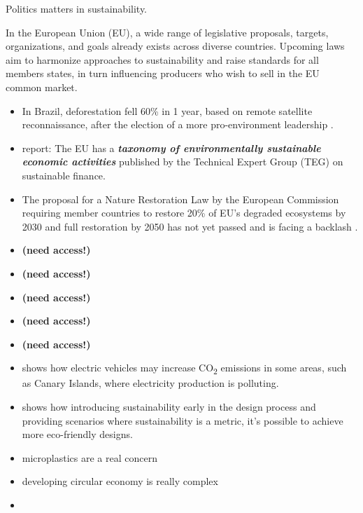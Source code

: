 \documentclass[
  letterpaper,
  DIV=11,
  numbers=noendperiod]{scrartcl}
\begin{document}
Politics matters in sustainability.

In the European Union (EU), a wide range of legislative proposals,
targets, organizations, and goals already exists across diverse
countries. Upcoming laws aim to harmonize approaches to sustainability
and raise standards for all members states, in turn influencing
producers who wish to sell in the EU common market.

\begin{itemize}
\item
  In Brazil, deforestation fell 60\% in 1 year, based on remote
  satellite reconnaissance, after the election of a more pro-environment
  leadership \citet{wattsAmazonDeforestationFalls2023}.
\item
  \citet{EUTaxonomySustainable} report: The EU has a
  \textbf{\emph{taxonomy of environmentally sustainable economic
  activities}} published by the Technical Expert Group (TEG) on
  sustainable finance.
\item
  The proposal for a Nature Restoration Law by the European Commission
  requiring member countries to restore 20\% of EU's degraded ecosystems
  by 2030 and full restoration by 2050 has not yet passed
  \citet{ScientistsUrgeEuropean2023} and is facing a backlash
  \citet{davidpintoBacklashNatureRestoration2023}.
\item
  \citet{MANZARDO2021149507} \textbf{(need access!)}
\item
  \citet{INARRA2022100727} \textbf{(need access!)}
\item
  \citet{MUNARO2022566} \textbf{(need access!)}
\item
  \citet{BASSANI2022151565} \textbf{(need access!)}
\item
  \citet{VANDOORSSELAER2022189} \textbf{(need access!)}
\item
  \citet{NUEZ2022133252} shows how electric vehicles may increase
  CO\textsubscript{2} emissions in some areas, such as Canary Islands,
  where electricity production is polluting.
\item
  \citet{ROSSI2022823} shows how introducing sustainability early in the
  design process and providing scenarios where sustainability is a
  metric, it's possible to achieve more eco-friendly designs.
\item
  \citet{TIERNAN2022169} microplastics are a real concern
\item
  \citet{ARRANZ2022131738} developing circular economy is really complex
\item
  \citet{CHEBA2022108601}

\end{itemize}
\end{document}
